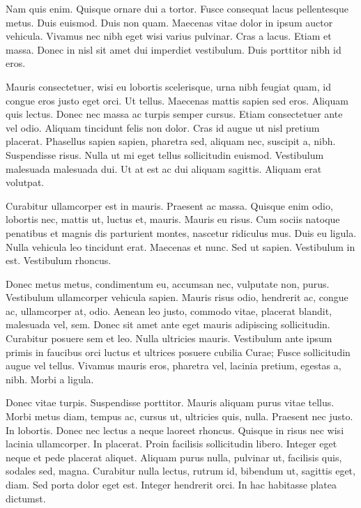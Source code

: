 \documentclass{article}
\begin{document}
Nam quis enim. Quisque ornare dui a tortor. Fusce consequat lacus
pellentesque metus. Duis euismod. Duis non quam. Maecenas vitae dolor in ipsum
auctor vehicula. Vivamus nec nibh eget wisi varius pulvinar. Cras a lacus.
Etiam et massa. Donec in nisl sit amet dui imperdiet vestibulum. Duis porttitor
nibh id eros.

Mauris consectetuer, wisi eu lobortis scelerisque, urna nibh feugiat quam,
id congue eros justo eget orci. Ut tellus. Maecenas mattis sapien sed eros.
Aliquam quis lectus. Donec nec massa ac turpis semper cursus. Etiam
consectetuer ante vel odio. Aliquam tincidunt felis non dolor. Cras id augue ut
nisl pretium placerat. Phasellus sapien sapien, pharetra sed, aliquam nec,
suscipit a, nibh. Suspendisse risus. Nulla ut mi eget tellus sollicitudin
euismod. Vestibulum
malesuada malesuada dui. Ut at est ac dui aliquam sagittis. Aliquam erat
volutpat.

Curabitur ullamcorper est in mauris. Praesent ac massa. Quisque enim odio,
lobortis nec, mattis ut, luctus et, mauris. Mauris eu risus. Cum sociis natoque
penatibus et magnis dis parturient montes, nascetur ridiculus mus. Duis eu
ligula. Nulla vehicula leo tincidunt erat. Maecenas et nunc. Sed ut sapien.
Vestibulum in est. Vestibulum rhoncus.

Donec metus metus, condimentum eu, accumsan nec, vulputate non, purus.
Vestibulum ullamcorper vehicula sapien. Mauris risus odio, hendrerit ac, congue
ac, ullamcorper at, odio. Aenean leo justo, commodo vitae, placerat blandit,
malesuada vel, sem. Donec sit amet ante eget mauris adipiscing sollicitudin.
Curabitur posuere sem et leo. Nulla ultricies mauris. Vestibulum ante ipsum
primis in faucibus orci luctus et ultrices posuere cubilia Curae; Fusce
sollicitudin augue vel tellus. Vivamus mauris eros, pharetra vel, lacinia
pretium, egestas a, nibh. Morbi a ligula.

Donec vitae turpis. Suspendisse porttitor. Mauris aliquam purus vitae
tellus. Morbi metus diam, tempus ac, cursus ut, ultricies quis, nulla. Praesent
nec justo. In lobortis. Donec nec lectus a neque laoreet rhoncus. Quisque in
risus nec wisi lacinia ullamcorper. In placerat. Proin facilisis sollicitudin
libero. Integer eget neque et pede placerat aliquet. Aliquam purus nulla,
pulvinar ut, facilisis quis, sodales sed, magna. Curabitur nulla lectus, rutrum
id, bibendum ut, sagittis eget, diam. Sed porta dolor eget est. Integer
hendrerit orci. In hac habitasse platea dictumst.
\end{document}

